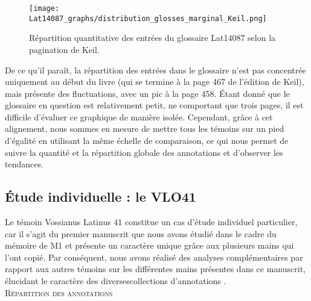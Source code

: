 \documentclass[a4paper, twoside, 12pt]{book}
\begin{document}
{\begin{figure}[H]
  \centering
  \texttt{[image: Lat14087\_graphs/distribution\_glosses\_marginal\_Keil.png]}
  \caption{Répartition quantitative des entrées du glossaire Lat14087 selon la pagination de Keil. }
  \label{fig:KeilLat14087}
\end{figure}

De ce qu'il paraît, la répartition des entrées dans le glossaire n'est pas concentrée uniquement au début du livre (qui se termine à la page 467 de l'édition de Keil), mais présente des fluctuations, avec un pic à la page 458. Étant donné que le glossaire en question est relativement petit, ne comportant que trois pages, il est difficile d'évaluer ce graphique de manière isolée. Cependant, grâce à cet alignement, nous sommes en mesure de mettre tous les témoins sur un pied d'égalité en utilisant la même échelle de comparaison, ce qui nous permet de suivre la quantité et la répartition globale des annotations et d'observer les tendances. \\


\subsection{Étude individuelle : le VLO41}

Le témoin Vossianus Latinus 41 constitue un cas d'étude individuel particulier, car il s'agit du premier manuscrit que nous avons étudié dans le cadre du mémoire de M1 et présente un caractère unique grâce aux plusieurs mains qui l'ont copié. Par conséquent, nous avons réalisé des analyses complémentaires par rapport aux autres témoins sur les différentes mains présentes dans ce manuscrit, élucidant le caractère des diverses\og{}collections d'annotations \fg{}.\\ 


\textsc{Répartition des annotations}

}
\end{document}
